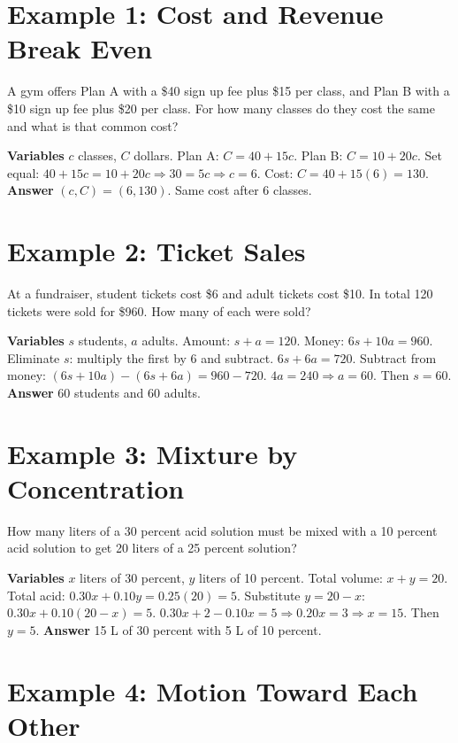 \documentclass[14pt]{extarticle}
\begin{document}
\section*{Example 1: Cost and Revenue Break Even}

A gym offers Plan A with a \$40 sign up fee plus \$15 per class, and Plan B with a \$10 sign up fee plus \$20 per class. For how many classes do they cost the same and what is that common cost?

\textbf{Variables} \(c\) classes, \(C\) dollars.  
Plan A: \(C = 40 + 15c\). Plan B: \(C = 10 + 20c\).  
Set equal: \(40 + 15c = 10 + 20c \Rightarrow 30 = 5c \Rightarrow c = 6\).  
Cost: \(C = 40 + 15(6) = 130\).  
\textbf{Answer} \((c, C) = (6, 130)\). Same cost after 6 classes.

\section*{Example 2: Ticket Sales}

At a fundraiser, student tickets cost \$6 and adult tickets cost \$10. In total 120 tickets were sold for \$960. How many of each were sold?

\textbf{Variables} \(s\) students, \(a\) adults.  
Amount: \(s + a = 120\). Money: \(6s + 10a = 960\).  
Eliminate \(s\): multiply the first by 6 and subtract.  
\(6s + 6a = 720\). Subtract from money: \((6s + 10a) - (6s + 6a) = 960 - 720\).  
\(4a = 240 \Rightarrow a = 60\). Then \(s = 60\).  
\textbf{Answer} 60 students and 60 adults.

\section*{Example 3: Mixture by Concentration}

How many liters of a 30 percent acid solution must be mixed with a 10 percent acid solution to get 20 liters of a 25 percent solution?

\textbf{Variables} \(x\) liters of 30 percent, \(y\) liters of 10 percent.  
Total volume: \(x + y = 20\).  
Total acid: \(0.30x + 0.10y = 0.25(20) = 5\).  
Substitute \(y = 20 - x\): \(0.30x + 0.10(20 - x) = 5\).  
\(0.30x + 2 - 0.10x = 5 \Rightarrow 0.20x = 3 \Rightarrow x = 15\).  
Then \(y = 5\).  
\textbf{Answer} 15 L of 30 percent with 5 L of 10 percent.

\section*{Example 4: Motion Toward Each Other}
\end{document}
